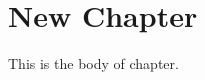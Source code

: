 \documentclass[12pt]{book}
\begin{document}
\chapter{New Chapter}
This is the body of chapter.
\end{document}
